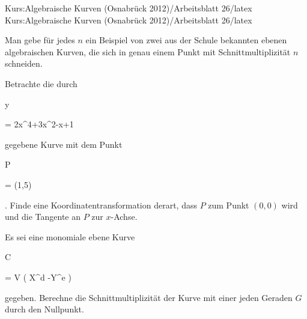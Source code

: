 Kurs:Algebraische Kurven (Osnabrück 2012)/Arbeitsblatt 26/latex
Kurs:Algebraische Kurven (Osnabrück 2012)/Arbeitsblatt 26/latex


\setcounter{section}{26}





{}

{


Man gebe für jedes $n$ ein Beispiel von zwei aus der Schule bekannten ebenen algebraischen Kurven, die sich in genau einem Punkt mit Schnittmultiplizität $n$ schneiden.


}

{} {}



{}

{


Betrachte die durch


\mavergleichskette

{\vergleichskette

{ y
}

{ = }{ 2x^4+3x^2-x+1
}

{  }{
}

{    }{
}

{   }{
}

}
{}{}{}
gegebene Kurve mit dem Punkt


\mavergleichskette

{\vergleichskette

{ P
}

{ = }{ (1,5)
}

{  }{
}

{    }{
}

{   }{
}

}
{}{}{.}
Finde eine Koordinatentransformation derart, dass $P$ zum Punkt $(0,0)$ wird und die Tangente an $P$ zur $x$-Achse.


}

{} {}



{}

{


Es sei eine monomiale ebene Kurve


\mavergleichskette

{\vergleichskette

{ C
}

{ = }{ V \left(  X^d -Y^e  \right)
}

{  }{
}

{    }{
}

{   }{
}

}
{}{}{}
 {} {}
gegeben. Berechne die Schnittmultiplizität der Kurve mit einer jeden Geraden $G$ durch den Nullpunkt.


}

